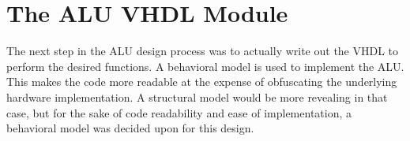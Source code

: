\documentclass{article}
\begin{document}

\section{The ALU VHDL Module}

The next step in the ALU design process was to actually write out the
VHDL to perform the desired functions. A behavioral model is used to implement
the ALU. This makes the code more readable at the expense of obfuscating the underlying
hardware implementation. A structural model would be more revealing in that case, but for
the sake of code readability and ease of implementation, a behavioral model was decided upon
for this design.
\end{document}
